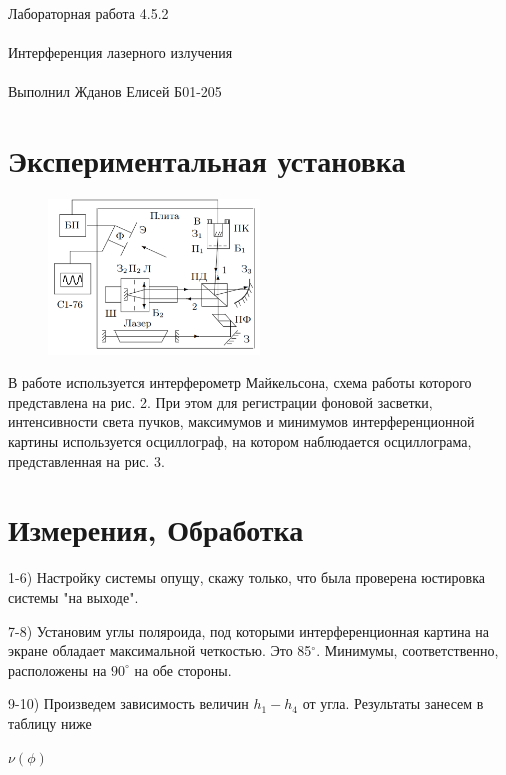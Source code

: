 \documentclass{astroedu-lab}
\begin{document}
\begin{problem}{\huge Лабораторная работа 4.5.2\\\\Интерференция лазерного излучения\\\\Выполнил Жданов Елисей Б01-205}
\section{Экспериментальная установка}

\begin{figure}[!h]
	\centering
	\includegraphics[width=0.5\textwidth]{2.png}
	\label{fig:boiler}
\end{figure}

В работе используется интерферометр Майкельсона, схема работы которого представлена на рис. 2. При этом для регистрации фоновой засветки, интенсивности света пучков, максимумов и минимумов интерференционной картины используется осциллограф, на котором наблюдается осциллограма, представленная на рис. 3.

\section{Измерения, Обработка}

1-6) Настройку системы опущу, скажу только, что была проверена юстировка системы "на выходе".

7-8) Установим углы поляроида, под которыми интерференционная картина на экране обладает максимальной четкостью. Это 85$^\circ$.
Минимумы, соответственно, расположены на $90^\circ$ на обе стороны.

9-10) Произведем зависимость величин $h_1 - h_4$ от угла. Результаты занесем в таблицу ниже

\newpage

\begin{center}
	\Large $\nu(\phi)$
\end{center}


\end{problem}
\end{document}
